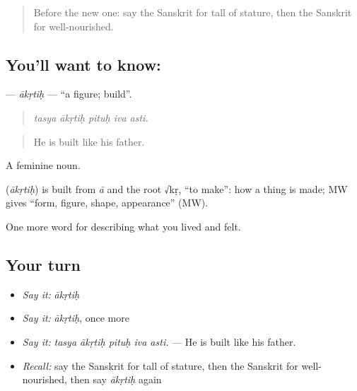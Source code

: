 \begin{quote}
Before the new one: say the Sanskrit for tall of stature, then the Sanskrit for well-nourished.
\end{quote}

\subsection*{You'll want to know: }
\textbf{} — \emph{ākṛtiḥ} — \textquotedblleft{}a figure; build\textquotedblright{}.

\begin{quote}
    
\end{quote}

\begin{quote}
\emph{tasya ākṛtiḥ pituḥ iva asti.}
\end{quote}

\begin{quote}
He is built like his father.
\end{quote}

A feminine noun.

\begin{cousinweb}
\textbf{} (\emph{ākṛtiḥ}) is built from \emph{ā} and the root √kṛ, \textquotedblleft{}to make\textquotedblright{}: how a thing is made; MW gives \textquotedblleft{}form, figure, shape, appearance\textquotedblright{} (MW).
\end{cousinweb}

\begin{grammarlens}[title={What you've built}]
One more word for describing what you lived and felt.
\end{grammarlens}

\subsection*{Your turn}
\begin{itemize}
\raggedright
  \item \emph{Say it:} \emph{ākṛtiḥ}
  \item \emph{Say it:} \emph{ākṛtiḥ}, once more
  \item \emph{Say it:} \emph{tasya ākṛtiḥ pituḥ iva asti.} — He is built like his father.
  \item \emph{Recall:} say the Sanskrit for tall of stature, then the Sanskrit for well-nourished, then say \emph{ākṛtiḥ} again
\end{itemize}

